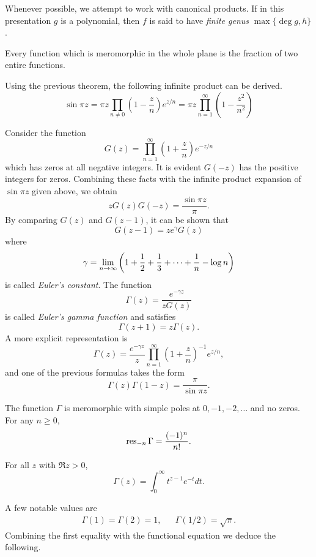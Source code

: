 Whenever possible, we attempt to work with canonical products. If in this presentation $g$ is a polynomial, then $f$ is said to have \emph{finite genus} $\max\{\deg g, h\}$.

\begin{corollary}
  Every function which is meromorphic in the whole plane is the fraction of two entire functions.
\end{corollary}

Using the previous theorem, the following infinite product can be derived.
\[
\sin \pi z = \pi z \prod_{n \neq 0} \left( 1 - \frac{z}{n} \right) e^{z/n} = \pi z \prod_{n=1}^\infty \left( 1 - \frac{z^2}{n^2} \right)
\]

Consider the function
\[
G(z) = \prod_{n=1}^\infty \left( 1 + \frac{z}{n} \right) e^{-z/n}
\]
which has zeros at all negative integers. It is evident $G(-z)$ has the positive integers for zeros. Combining these facts with the infinite product expansion of $\sin \pi z$ given above, we obtain
\[
z G(z) G(-z)= \frac{\sin \pi z}{\pi}.
\]
By comparing $G(z)$ and $G(z-1)$, it can be shown that
\[
G(z-1) = z e^\gamma G(z)
\]
where
\[
\gamma = \lim_{n \rightarrow \infty} \left( 1 + \frac{1}{2} + \frac{1}{3} + \cdots + \frac{1}{n} - \log n \right)
\]
is called \emph{Euler's constant}. The function
\[
\Gamma(z) = \frac{e^{-\gamma z}}{z G(z)}
\]
is called \emph{Euler's gamma function} and satisfies
\[
\Gamma(z+1) = z \Gamma(z).
\]
A more explicit representation is
\[
\Gamma(z) = \frac{e^{-\gamma z}}{z} \prod_{n=1}^\infty \left( 1 + \frac{z}{n} \right)^{-1} e^{z/n},
\]
and one of the previous formulas takes the form
\[
\Gamma(z) \Gamma(1-z) = \frac{\pi}{\sin \pi z}.
\]

\begin{proposition}
  The function $\Gamma$ is meromorphic with simple poles at $0, -1, -2, \dots$ and no zeros. For any $n \geq 0$,
  \[
  \operatorname{res}_{-n}\Gamma = \frac{(-1)^n}{n!}.
  \]
\end{proposition}

\begin{proposition}
  For all $z$ with $\Re z > 0$,
  \[
  \Gamma(z) = \int_0^\infty t^{z-1} e^{-t} d t.
  \]
\end{proposition}

A few notable values are
\begin{align*}
\Gamma(1) = \Gamma(2) = 1, && \Gamma(1/2) = \sqrt{\pi}.  
\end{align*}
Combining the first equality with the functional equation we deduce the following.


